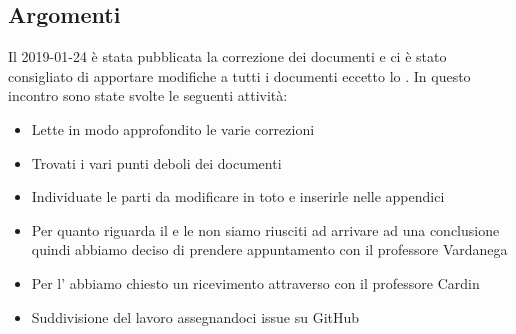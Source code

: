         \subsection{Argomenti}
            Il 2019-01-24 è stata pubblicata la correzione dei documenti e ci è stato consigliato di apportare modifiche a tutti i documenti eccetto lo \SdFd.
            In questo incontro sono state svolte le seguenti attività:
            \begin{itemize}
                \item Lette in modo approfondito le varie correzioni
                \item Trovati i vari punti deboli dei documenti
                \item Individuate le parti da modificare in toto e inserirle nelle appendici
                \item Per quanto riguarda il  e le  non siamo riusciti ad arrivare ad una conclusione quindi abbiamo deciso di prendere appuntamento con il professore Vardanega
                \item Per l' abbiamo chiesto un ricevimento attraverso  con il professore Cardin
                \item Suddivisione del lavoro assegnandoci issue su GitHub
        \end{itemize}

